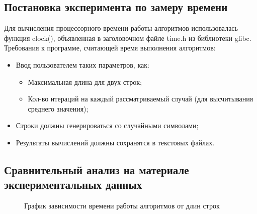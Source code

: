 \documentclass[a4paper,12pt]{article}
\begin{document}
\newpage
\subsection{Постановка эксперимента по замеру времени}
\begin{flushleft}
Для вычисления процессорного времени работы алгоритмов использовалась функция clock(), объявленная в заголовочном файле time.h из библиотеки glibc. \\
Требования к программе, считающей время выполнения алгоритмов:
\begin{itemize}
\item Ввод пользователем таких параметров, как:
\begin{itemize}
\item Максимальная длина для двух строк;
\item Кол-во итераций на каждый рассматриваемый случай (для высчитывания среднего значения);
\end{itemize}
\item Строки должны генерироваться со случайными символами;
\item Результаты вычислений должны сохранятся в текстовых файлах.
\end{itemize}
\end{flushleft}

\newpage
\subsection{Сравнительный анализ на материале экспериментальных данных}

\begin{figure}[h]
\caption{График зависимости времени работы алгоритмов от длин строк}
\label{images:graphics}
\end{figure}
\end{document}
